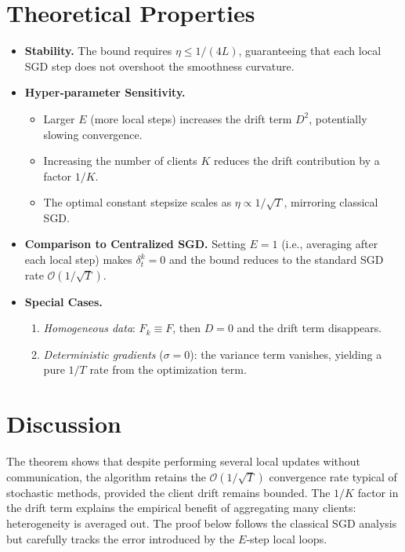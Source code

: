 \documentclass{article}
\begin{document}
\section*{Theoretical Properties}
\begin{itemize}[leftmargin=*]
\item \textbf{Stability.} The bound requires $\eta\le 1/(4L)$, guaranteeing that each local SGD step does not overshoot the smoothness curvature.
\item \textbf{Hyper‑parameter Sensitivity.}
    \begin{itemize}
        \item Larger $E$ (more local steps) increases the drift term $D^2$, potentially slowing convergence.
        \item Increasing the number of clients $K$ reduces the drift contribution by a factor $1/K$.
        \item The optimal constant stepsize scales as $\eta\propto 1/\sqrt{T}$, mirroring classical SGD.
    \end{itemize}
\item \textbf{Comparison to Centralized SGD.}
    Setting $E=1$ (i.e., averaging after each local step) makes $\delta_{t}^{k}=0$ and the bound reduces to the standard SGD rate $\mathcal{O}(1/\sqrt{T})$.
\item \textbf{Special Cases.}
    \begin{enumerate}
        \item \emph{Homogeneous data}: $F_k\equiv F$, then $D=0$ and the drift term disappears.
        \item \emph{Deterministic gradients} ($\sigma=0$): the variance term vanishes, yielding a pure $1/T$ rate from the optimization term.
    \end{enumerate}
\end{itemize}

\section*{Discussion}
The theorem shows that despite performing several local updates without communication, the algorithm retains the $\mathcal{O}(1/\sqrt{T})$ convergence rate typical of stochastic methods, provided the client drift remains bounded. The $1/K$ factor in the drift term explains the empirical benefit of aggregating many clients: heterogeneity is averaged out. The proof below follows the classical SGD analysis but carefully tracks the error introduced by the $E$‑step local loops.
\end{document}
